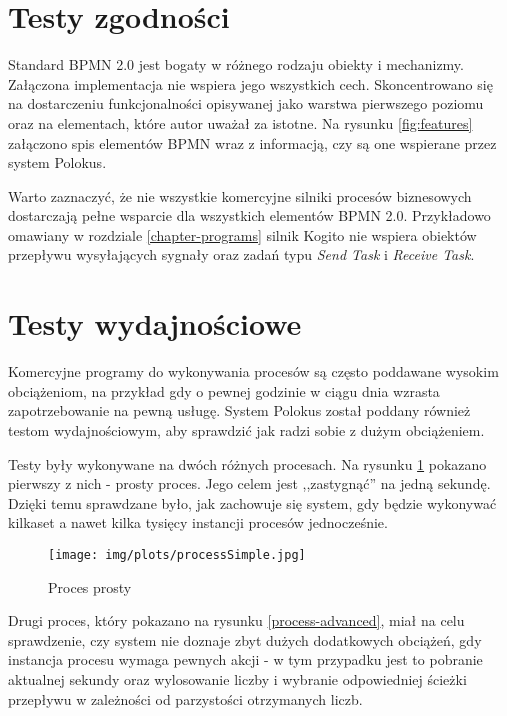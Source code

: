 \documentclass[declaration,shortabstract,mgr]{iithesis}
\newcommand{\bpmn}{BPMN }
\begin{document}
\section{Testy zgodności}

Standard \bpmn 2.0 jest bogaty w różnego rodzaju obiekty i mechanizmy. Załączona implementacja nie wspiera jego wszystkich cech. Skoncentrowano się na dostarczeniu funkcjonalności opisywanej jako warstwa pierwszego poziomu oraz na elementach, które autor uważał za istotne. Na rysunku \ref{fig:features} załączono spis elementów \bpmn wraz z informacją, czy są one wspierane przez system Polokus.

Warto zaznaczyć, że nie wszystkie komercyjne silniki procesów biznesowych dostarczają pełne wsparcie dla wszystkich elementów \bpmn 2.0. Przykładowo omawiany w rozdziale \ref{chapter-programs} silnik Kogito nie wspiera obiektów przepływu wysyłających sygnały oraz zadań typu \textit{Send Task} i \textit{Receive Task}.

\section{Testy wydajnościowe}

Komercyjne programy do wykonywania procesów są często poddawane wysokim obciążeniom, na przykład gdy o pewnej godzinie w ciągu dnia wzrasta zapotrzebowanie na pewną usługę. System Polokus został poddany również testom wydajnościowym, aby sprawdzić jak radzi sobie z dużym obciążeniem.

Testy były wykonywane na dwóch różnych procesach. Na rysunku \ref{process-simple} pokazano pierwszy z nich - prosty proces. Jego celem jest ,,zastygnąć'' na jedną sekundę. Dzięki temu sprawdzane było, jak zachowuje się system, gdy będzie wykonywać kilkaset a nawet kilka tysięcy instancji procesów jednocześnie.

\begin{figure}[h]
     \centering
     \texttt{[image: img/plots/processSimple.jpg]}
     \caption{Proces prosty}
     \label{process-simple}
\end{figure}

Drugi proces, który pokazano na rysunku \ref{process-advanced}, miał na celu sprawdzenie, czy system nie doznaje zbyt dużych dodatkowych obciążeń, gdy instancja procesu wymaga pewnych akcji - w tym przypadku jest to pobranie aktualnej sekundy oraz wylosowanie liczby i wybranie odpowiedniej ścieżki przepływu w zależności od parzystości otrzymanych liczb.
\end{document}
